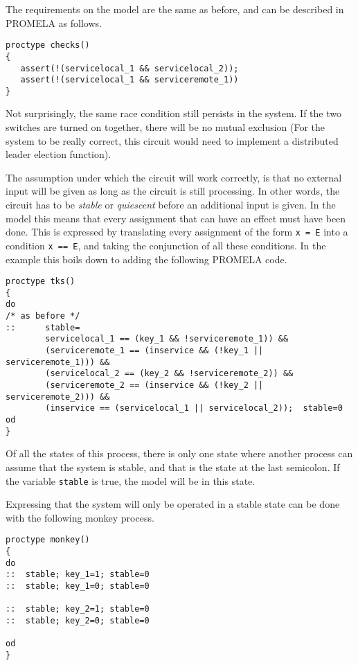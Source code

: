 The requirements on the model are the same as before, and can be described in PROMELA as follows.

\begin{verbatim}
proctype checks()
{
   assert(!(servicelocal_1 && servicelocal_2));
   assert(!(servicelocal_1 && serviceremote_1))
}
\end{verbatim}

Not surprisingly, the same race condition still persists in the system. If the two switches are
turned on together, there will be no mutual exclusion
(For the system to be really correct, this circuit would need to implement a distributed leader election\cite{LE} function).

The assumption under which the circuit will work correctly, is that no external input will be
given as long as the circuit is still processing. In other words, the circuit has to be
{\em stable} or {\em quiescent} before an additional input is given.
In the model this means that every assignment that can have an effect must have been done.
This is expressed by translating every assignment of the form {\tt x = E} into a condition
{\tt x == E}, and taking the conjunction of all these conditions.
In the example this boils down to adding the following PROMELA code.

\begin{verbatim}
proctype tks()
{
do
/* as before */
::      stable=
        servicelocal_1 == (key_1 && !serviceremote_1)) &&
        (serviceremote_1 == (inservice && (!key_1 || serviceremote_1))) &&
        (servicelocal_2 == (key_2 && !serviceremote_2)) &&
        (serviceremote_2 == (inservice && (!key_2 || serviceremote_2))) &&
        (inservice == (servicelocal_1 || servicelocal_2));  stable=0
od
}
\end{verbatim}

Of all the states of this process, there is only one state where another process can assume that
the system is stable, and that is the state at the last semicolon.
If the variable {\tt stable} is true, the model will be in this state.

Expressing that the system will only be operated in a stable state
can be done with the following monkey process.

\begin{verbatim}
proctype monkey()
{
do
::	stable; key_1=1; stable=0
::	stable; key_1=0; stable=0

::	stable; key_2=1; stable=0
::	stable; key_2=0; stable=0

od
}
\end{verbatim}

